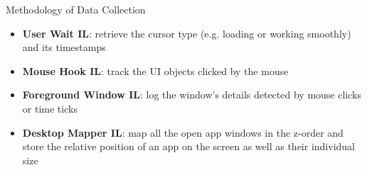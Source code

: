 \documentclass[final]{beamer}
\newlength{\colwidth}
\begin{document}
\begin{frame}[t]
\begin{columns}[t]
\begin{column}{\colwidth}
\begin{alertblock}{\LARGE{Methodology of Data Collection}}
{\begin{itemize}
            \item \textbf{User Wait IL}: retrieve the cursor type (e.g. loading or working smoothly) and its timestamps

            \item \textbf{Mouse Hook IL}: track the UI objects clicked by the mouse

            \item \textbf{Foreground Window IL}: log the window's details detected by mouse clicks or time ticks

            \item \textbf{Desktop Mapper IL}: map all the open app windows in the z-order and store the relative position of an app on the screen as well as their individual size

          \end{itemize}

}
\end{alertblock}
\end{column}
\end{columns}
\end{frame}
\end{document}
